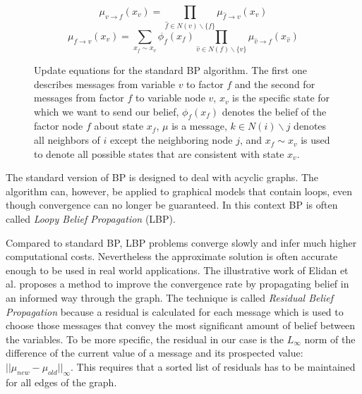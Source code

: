 \begin{figure}
\label{eqn:bp_message}
\begin{equation*}                                                            
\mu_{v\rightarrow f}(x_v) = \prod_{\hat f \in N(v)\backslash \{f\}} \mu_{\hat f\rightarrow v}(x_v)
\end{equation*}
\begin{equation*}                                                            
\mu_{f\rightarrow v}(x_v) = \sum_{x_f \sim x_v}\phi_f(x_f) \prod_{\hat v \in N(f)\backslash \{v\}} \mu_{\hat v\rightarrow f}(x_{\hat v})
\end{equation*}
\caption{Update equations for the standard BP algorithm. The first one describes messages from variable $v$ to factor $f$ and the second for messages from factor $f$ to variable node $v$, $x_v$ is the specific state for which we want to send our belief, $\phi_f(x_f)$ denotes the belief of the factor node $f$ about state $x_f$, $\mu$ is a message, $k \in N(i)\backslash j$ denotes all neighbors of $i$ except the neighboring node $j$, and $x_f \sim x_v$ is used to denote all possible states that are consistent with state $x_v$.}
\end{figure}

The standard version of BP is designed to deal with acyclic graphs. The algorithm can, however, be applied to graphical models that contain loops, even though  convergence can no longer be guaranteed. In this context BP is often called \textit{Loopy Belief Propagation} (LBP).

Compared to standard BP, LBP problems converge slowly and infer much higher computational costs. Nevertheless the approximate solution is often accurate enough to be used in real world applications. The illustrative work of Elidan et al. \cite{elidan2012residual} proposes a method to improve the convergence rate by propagating belief in an informed way through the graph. The technique is called \textit{Residual Belief Propagation} because a residual is calculated for each message which is used to choose those messages that convey the most significant amount of belief between the variables. To be more specific, the residual in our case is the $L_\infty$ norm of the difference of the current value of a message and its prospected value: $||\mu_{new} - \mu_{old}||_\infty$. This requires that a sorted list of residuals has to be maintained for all edges of the graph.


